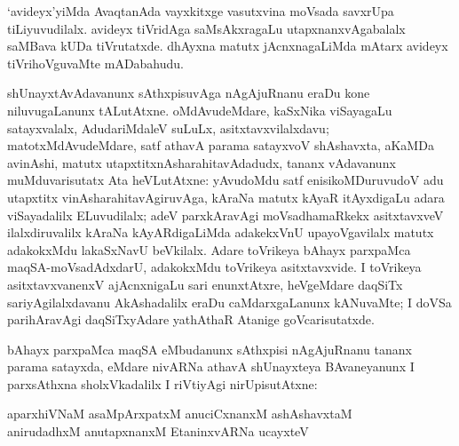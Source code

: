 `avideyx'yiMda AvaqtanAda vayxkitxge vasutxvina moVsada savxrUpa tiLiyuvudilalx. avideyx tiVridAga saMsAkxragaLu utapxnanxvAgabalalx saMBava kUDa tiVrutatxde. dhAyxna matutx jAcnxnagaLiMda mAtarx avideyx tiVrihoVguvaMte mADabahudu.

shUnayxtAvAdavanunx sAthxpisuvAga nAgAjuRnanu eraDu kone niluvugaLanunx tALutAtxne. oMdAvudeMdare, kaSxNika viSayagaLu satayxvalalx, AdudariMdaleV suLuLx, asitxtavxvilalxdavu; matotxMdAvudeMdare, satf athavA parama satayxvoV shAshavxta, aKaMDa avinAshi, matutx utapxtitxnAsharahitavAdadudx, tananx vAdavanunx muMduvarisutatx Ata heVLutAtxne: yAvudoMdu satf enisikoMDuruvudoV adu utapxtitx vinAsharahitavAgiruvAga, kAraNa matutx kAyaR itAyxdigaLu adara viSayadalilx ELuvudilalx; adeV parxkAravAgi moVsadhamaRkekx asitxtavxveV ilalxdiruvalilx kAraNa kAyARdigaLiMda adakekxVnU upayoVgavilalx matutx adakokxMdu lakaSxNavU beVkilalx. Adare toVrikeya bAhayx parxpaMca maqSA-moVsadAdxdarU, adakokxMdu toVrikeya asitxtavxvide. I toVrikeya asitxtavxvanenxV ajAcnxnigaLu sari enunxtAtxre, heVgeMdare daqSiTx sariyAgilalxdavanu AkAshadalilx eraDu caMdarxgaLanunx kANuvaMte; I doVSa parihAravAgi daqSiTxyAdare yathAthaR Atanige goVcarisutatxde.

bAhayx parxpaMca maqSA eMbudanunx sAthxpisi nAgAjuRnanu tananx parama satayxda, eMdare nivARNa athavA shUnayxteya BAvaneyanunx I parxsAthxna sholxVkadalilx I riVtiyAgi nirUpisutAtxne:

\begin{shloka}
aparxhiVNaM asaMpArxpatxM anuciCxnanxM ashAshavxtaM\\
anirudadhxM anutapxnanxM EtaninxvARNa ucayxteV
\end{shloka}

